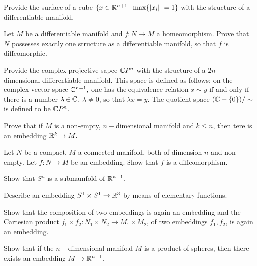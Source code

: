 \begin{problem}{6}
Provide the surface of a cube $\{x\in \mathbb{R}^{n+1} \mid \max \{\lvert x_i \rvert\ = 1 \}$ with the structure of a differentiable manifold. 
\end{problem}

\begin{problem}{7}
Let $M$ be a differentiable manifold and $f: N \rightarrow M$ a homeomorphism. Prove that $N$ possesses exactly one structure as a differentiable manifold, so that $f$ is diffeomorphic.
\end{problem}

\begin{problem}{8}
Provide the complex projective sapce $\mathbb{C} P^n$ with the structure of a $2n-$dimensional differentiable manifold. This space is defined as follows: on the complex vector space $\mathbb{C}^{n+1},$ one has the equivalence relation $x \sim y$ if and only if there is a number $\lambda \in \mathbb{C}$, $\lambda \neq 0$, so that $\lambda x = y$. The quotient space $(\mathbb{C} - \{0\}) / \sim $ is defined to be $\mathbb{C} P^n$. 
\end{problem}

\begin{problem}{9}
Prove that if $M$ is a non-empty, $n-$dimensional manifold and $k \leq n$, then tere is an embedding $\mathbb{R}^k \rightarrow M.$
\end{problem}

\begin{problem}{10}
Let $N$ be a compact, $M$ a connected manifold, both of dimension $n$ and non-empty. Let $f: N \rightarrow M$ be an embedding. Show that $f$ is a diffeomorphism.
\end{problem}


\begin{problem}{11}
Show that $S^n$ is a submanifold of $\mathbb{R}^{n+1}.$
\end{problem}


\begin{problem}{12}
Describe an embedding $S^1 \times S^1 \rightarrow \mathbb{R}^3$ by means of elementary functions.
\end{problem}


\begin{problem}{13}
Show that the composition of two embeddings is again an embedding and the Cartesian product $f_1 \times f_2: N_1 \times N_2 \rightarrow M_1 \times M_2$, of two embeddings $f_1, f_2$, is again an embedding. 
\end{problem}


\begin{problem}{14}
Show that if the $n-$dimensional manifold $M$ is a product of spheres, then there exists an embedding $M\rightarrow \mathbb{R}^{n+1}.$
\end{problem}


